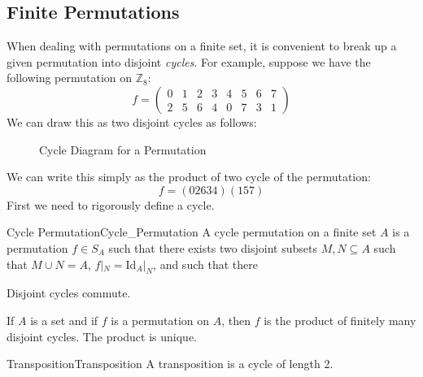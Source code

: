     \subsection{Finite Permutations}
        When dealing with permutations on a finite set, it is convenient to
        break up a given permutation into disjoint \textit{cycles}. For example,
        suppose we have the following permutation on $\mathbb{Z}_{8}$:
        \begin{equation}
            f=
            \begin{pmatrix}
                0&1&2&3&4&5&6&7\\
                2&5&6&4&0&7&3&1
            \end{pmatrix}
        \end{equation}
        We can draw this as two disjoint cycles as follows:
        \begin{figure}[H]
            \centering
            \captionsetup{type=figure}
            
            \caption{Cycle Diagram for a Permutation}
            \label{fig:Cycle_Diagram_of_Permutation}
        \end{figure}
        We can write this simply as the product of two cycle of the permutation:
        \begin{equation}
            f=(02634)(157)
        \end{equation}
        First we need to rigorously define a cycle.
        \begin{fdefinition}{Cycle Permutation}{Cycle_Permutation}
            A cycle permutation on a finite set $A$ is a permutation
            $f\in{S}_{A}$ such that there exists two disjoint subsets
            $M,N\subseteq{A}$ such that $M\cup{N}=A$,
            $f|_{N}=\textrm{Id}_{A}|_{N}$, and such that there 
        \end{fdefinition}
        \begin{theorem}
            Disjoint cycles commute.
        \end{theorem}
        \begin{theorem}
            If $A$ is a set and if $f$ is a permutation on $A$, then $f$ is
            the product of finitely many disjoint cycles. The product is unique.
        \end{theorem}
        \begin{fdefinition}{Transposition}{Transposition}
            A transposition is a cycle of length 2.
        \end{fdefinition}
